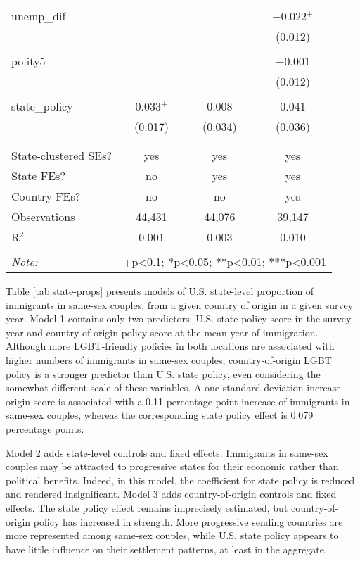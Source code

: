 \documentclass[
  11pt,
]{article}
\begin{document}
\begin{table}[!htbp]
\begin{tabular}{@{\extracolsep{5pt}}lccc}
 unemp\_dif &  &  & $-$0.022$^{+}$ \\ 
  &  &  & (0.012) \\ 
  & & & \\ 
 polity5 &  &  & $-$0.001 \\ 
  &  &  & (0.012) \\ 
  & & & \\ 
 state\_policy & 0.033$^{+}$ & 0.008 & 0.041 \\ 
  & (0.017) & (0.034) & (0.036) \\ 
  & & & \\ 
\hline \\[-1.8ex] 
State-clustered SEs? & yes & yes & yes \\ 
State FEs? & no & yes & yes \\ 
Country FEs? & no & no & yes \\ 
Observations & 44,431 & 44,076 & 39,147 \\ 
R$^{2}$ & 0.001 & 0.003 & 0.010 \\ 
\hline 
\hline \\[-1.8ex] 
\textit{Note:}  & \multicolumn{3}{r}{+p<0.1; *p<0.05; **p<0.01; ***p<0.001} \\ 
\end{tabular} 
\end{table}

Table \ref{tab:state-props} presents models of U.S. state-level proportion of immigrants in same-sex couples, from a given country of origin in a given survey year. Model 1 contains only two predictors: U.S. state policy score in the survey year and country-of-origin policy score at the mean year of immigration. Although more LGBT-friendly policies in both locations are associated with higher numbers of immigrants in same-sex couples, country-of-origin LGBT policy is a stronger predictor than U.S. state policy, even considering the somewhat different scale of these variables. A one-standard deviation increase origin score is associated with a 0.11 percentage-point increase of immigrants in same-sex couples, whereas the corresponding state policy effect is 0.079 percentage points.

Model 2 adds state-level controls and fixed effects. Immigrants in same-sex couples may be attracted to progressive states for their economic rather than political benefits. Indeed, in this model, the coefficient for state policy is reduced and rendered insignificant. Model 3 adds country-of-origin controls and fixed effects. The state policy effect remains imprecisely estimated, but country-of-origin policy has increased in strength. More progressive sending countries are more represented among same-sex couples, while U.S. state policy appears to have little influence on their settlement patterns, at least in the aggregate.
\end{document}
